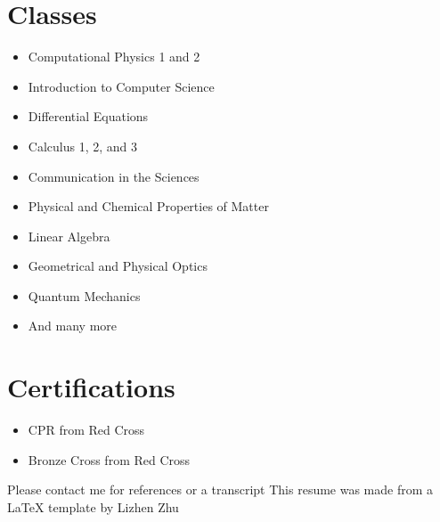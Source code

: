 \documentclass[]{cv-style}          %
\begin{document}
\section{Classes}
\begin{itemize}
    \item Computational Physics 1 and 2
    \item Introduction to Computer Science
    \item Differential Equations
    \item Calculus 1, 2, and 3
    \item Communication in the Sciences
    \item Physical and Chemical Properties of Matter
    \item Linear Algebra
    \item Geometrical and Physical Optics
    \item Quantum Mechanics
    \item And many more
\end{itemize}

\section{Certifications}
\begin{itemize}
    \item CPR from Red Cross
    \item Bronze Cross from Red Cross
\end{itemize}


Please contact me for references or a transcript \newline
This resume was made from a LaTeX template by Lizhen Zhu
\end{document}
